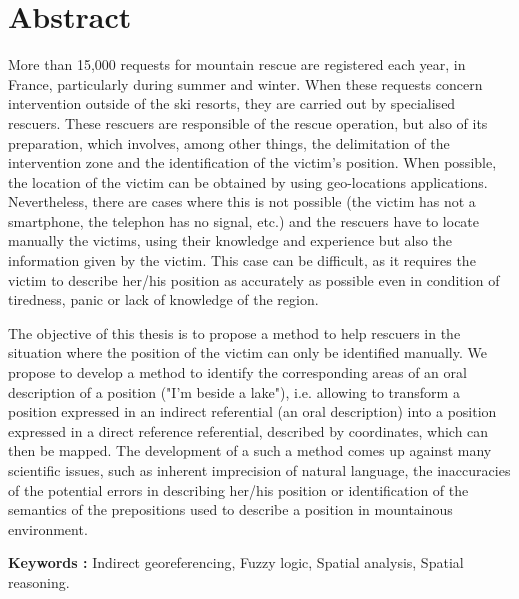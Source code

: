 \section*{Abstract}

More than 15,000 requests for mountain rescue are registered each
year, in France, particularly during summer and winter. When these
requests concern intervention outside of the ski resorts, they are
carried out by specialised rescuers. These rescuers are responsible of
the rescue operation, but also of its preparation, which involves,
among other things, the delimitation of the intervention zone and the
identification of the victim's position. When possible, the location
of the victim can be obtained by using geo-locations
applications. Nevertheless, there are cases where this is not possible
(\eg the victim has not a smartphone, the telephon has no signal,
etc.) and the rescuers have to locate manually the victims, using
their knowledge and experience but also the information given by the
victim. This case can be difficult, as it requires the victim to
describe her/his position as accurately as possible even in condition
of tiredness, panic or lack of knowledge of the region.

The objective of this thesis is to propose a method to help rescuers
in the situation where the position of the victim can only be
identified manually. We propose to develop a method to identify the
corresponding areas of an oral description of a position (\eg "I'm
beside a lake"), i.e. allowing to transform a position expressed in an
indirect referential (an oral description) into a position expressed
in a direct reference referential, \ie described by coordinates,
which can then be mapped. The development of a such a method comes up
against many scientific issues, such as inherent imprecision of
natural language, the inaccuracies of the potential errors in
describing her/his position or identification of the semantics of the
prepositions used to describe a position in mountainous environment.

\vspace{.5cm}

\noindent\textbf{Keywords :} Indirect georeferencing, Fuzzy logic,
Spatial analysis, Spatial reasoning.\par